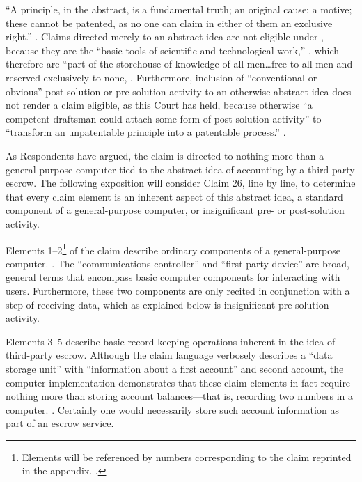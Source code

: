 \documentclass{scotus}
\begin{document}
``A principle, in the abstract, is a fundamental truth; an original cause; a
motive; these cannot be patented, as no one can claim in either of them an
exclusive right.'' .
Claims directed merely to an abstract idea are
not eligible under , because they are the ``basic tools of
scientific and technological work,'' , which therefore
are ``part of the storehouse of knowledge of all men\ldots free to all men and
reserved exclusively to none, . Furthermore, inclusion of ``conventional or
obvious''
post-solution or pre-solution activity to an otherwise abstract idea does not
render a claim eligible, as this Court has held, because otherwise
``a competent draftsman could attach some form of post-solution activity'' to
``transform an unpatentable principle into a patentable process.''
.

As Respondents have argued, the claim is directed to nothing more than a
general-purpose computer tied to the abstract idea of accounting by a
third-party escrow. The following exposition will consider Claim 26, line by
line, to determine that every claim element is an inherent aspect of this
abstract idea, a standard component of a general-purpose computer, or
insignificant pre- or post-solution activity.


Elements 1--2\footnote{Elements will be referenced by numbers corresponding to
the claim reprinted in the appendix. .} of the
claim describe ordinary components of a general-purpose computer. . The ``communications controller'' and
``first party device'' are broad, general terms that encompass basic computer
components for interacting with users. Furthermore, these two components are
only recited in conjunction with a step of receiving data, which as explained
below is insignificant pre-solution activity.

Elements 3--5 describe basic record-keeping operations inherent in the idea of
third-party escrow. Although the claim language verbosely describes a ``data
storage unit'' with ``information about a first account'' and second account,
the computer implementation demonstrates that these claim elements in fact
require nothing more than storing account balances---that is, recording two
numbers in a computer. .
Certainly one would necessarily store such account information as part of an
escrow service.
\end{document}

